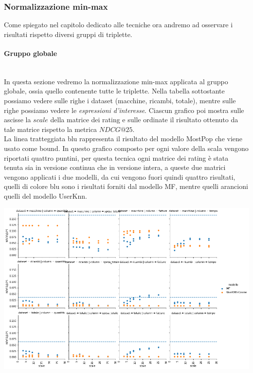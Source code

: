 \subsubsection{Normalizzazione min-max}
Come spiegato nel capitolo dedicato alle tecniche ora andremo ad osservare i risultati rispetto diversi gruppi di triplette.\\

\paragraph{Gruppo globale}\mbox{} \\
In questa sezione vedremo la normalizzazione min-max applicata al gruppo globale, ossia quello contenente tutte le triplette.
Nella tabella sottostante possiamo vedere sulle righe i dataset (macchine, ricambi, totale), mentre sulle righe possiamo vedere le \textit{espressioni d'interesse}. Ciascun grafico poi mostra sulle ascisse la $scale$ della matrice dei rating e sulle ordinate il risultato ottenuto da tale matrice rispetto la metrica $NDCG@25$. \\
La linea tratteggiata blu rappresenta il risultato del modello MostPop che viene usato come bound.
In questo grafico composto per ogni valore della scala vengono riportati quattro puntini, per questa tecnica ogni matrice dei rating è stata tenuta sia in versione continua che in versione intera, a queste due matrici vengono applicati i due modelli, da cui vengono fuori quindi quattro risultati, quelli di colore blu sono i risultati forniti dal modello MF, mentre quelli arancioni quelli del modello UserKnn.

\includegraphics[width=16cm]{figures/risultati_minmax_globale.png}


